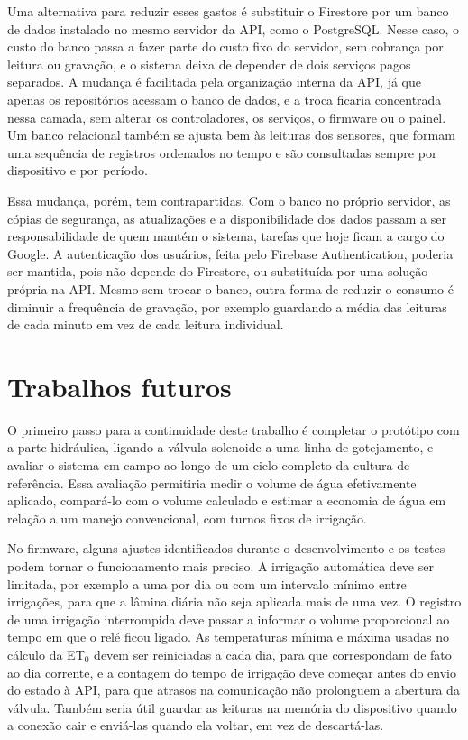 Uma alternativa para reduzir esses gastos é substituir o Firestore por um banco de dados instalado no mesmo servidor da API, como o PostgreSQL. Nesse caso, o custo do banco passa a fazer parte do custo fixo do servidor, sem cobrança por leitura ou gravação, e o sistema deixa de depender de dois serviços pagos separados. A mudança é facilitada pela organização interna da API, já que apenas os repositórios acessam o banco de dados, e a troca ficaria concentrada nessa camada, sem alterar os controladores, os serviços, o firmware ou o painel. Um banco relacional também se ajusta bem às leituras dos sensores, que formam uma sequência de registros ordenados no tempo e são consultadas sempre por dispositivo e por período.

Essa mudança, porém, tem contrapartidas. Com o banco no próprio servidor, as cópias de segurança, as atualizações e a disponibilidade dos dados passam a ser responsabilidade de quem mantém o sistema, tarefas que hoje ficam a cargo do Google. A autenticação dos usuários, feita pelo Firebase Authentication, poderia ser mantida, pois não depende do Firestore, ou substituída por uma solução própria na API. Mesmo sem trocar o banco, outra forma de reduzir o consumo é diminuir a frequência de gravação, por exemplo guardando a média das leituras de cada minuto em vez de cada leitura individual.

\section{Trabalhos futuros}
\label{sec:trabalhos-futuros}

O primeiro passo para a continuidade deste trabalho é completar o protótipo com a parte hidráulica, ligando a válvula solenoide a uma linha de gotejamento, e avaliar o sistema em campo ao longo de um ciclo completo da cultura de referência. Essa avaliação permitiria medir o volume de água efetivamente aplicado, compará-lo com o volume calculado e estimar a economia de água em relação a um manejo convencional, com turnos fixos de irrigação.

No firmware, alguns ajustes identificados durante o desenvolvimento e os testes podem tornar o funcionamento mais preciso. A irrigação automática deve ser limitada, por exemplo a uma por dia ou com um intervalo mínimo entre irrigações, para que a lâmina diária não seja aplicada mais de uma vez. O registro de uma irrigação interrompida deve passar a informar o volume proporcional ao tempo em que o relé ficou ligado. As temperaturas mínima e máxima usadas no cálculo da ET$_0$ devem ser reiniciadas a cada dia, para que correspondam de fato ao dia corrente, e a contagem do tempo de irrigação deve começar antes do envio do estado à API, para que atrasos na comunicação não prolonguem a abertura da válvula. Também seria útil guardar as leituras na memória do dispositivo quando a conexão cair e enviá-las quando ela voltar, em vez de descartá-las.

